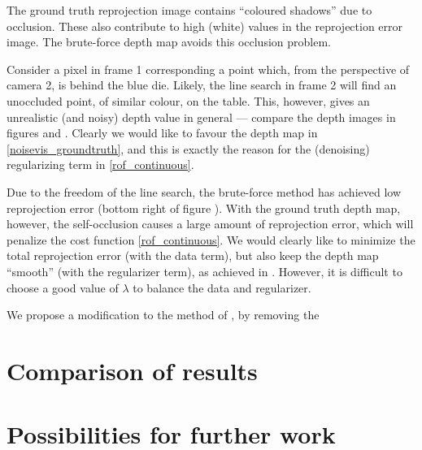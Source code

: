 \documentclass[conference]{IEEEtran}
\begin{document}
The ground truth reprojection image contains ``coloured shadows'' due to occlusion. These also contribute
to high (white) values in the reprojection error image. The brute-force depth map avoids this occlusion problem.

Consider a pixel in frame 1 corresponding a point which, from the perspective of camera 2, is behind the blue die.
Likely, the line search in frame 2 will find
an unoccluded point, of similar colour, on the table. This, however, gives an unrealistic (and noisy) depth value in general --- compare
the depth images in figures \cite{noisevis_groundtruth} and \cite{noisevis_computed}. Clearly we would like to favour the depth map in
\eqref{noisevis_groundtruth}, and this is exactly the reason for the (denoising) regularizing term in \eqref{rof_continuous}.

Due to the freedom of the line search, the brute-force method has achieved low reprojection error (bottom right of figure \cite{noisevis_computed}).
With the ground truth depth map, however, the self-occlusion causes a large amount of reprojection error, which will penalize the cost function
\eqref{rof_continuous}. We would clearly like to minimize the total reprojection error (with the data term), but also keep the depth map ``smooth'' (with the regularizer term), as achieved in \cite{dense_geometry}.
However, it is difficult to choose a good value of $\lambda$ to balance the data and regularizer.

We propose a modification to the method of \cite{dense_geometry}, by removing the 









\section{Comparison of results}
\section{Possibilities for further work}
\end{document}
